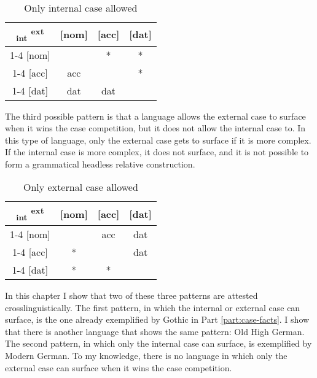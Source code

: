 \begin{table}[ht]
  \center
  \caption{Only internal case allowed}
  \begin{tabular}{c|c|c|c}
    \toprule
    \textsubscript{\ac{int}} \textsuperscript{\ac{ext}}
           & [\ac{nom}]
           & [\ac{acc}]
           & [\ac{dat}]
           \\ \cmidrule{1-4}
       [\ac{nom}]
           &
           & *
           & *
           \\ \cmidrule{1-4}
       [\ac{acc}]
           & \ac{acc}
           &
           & *
           \\ \cmidrule{1-4}
       [\ac{dat}]
           & \ac{dat}
           & \ac{dat}
           &
           \\
     \bottomrule
  \end{tabular}
    \label{tbl:case-competition-only-int}
\end{table}

The third possible pattern is that a language allows the external case to surface when it wins the case competition, but it does not allow the internal case to. In this type of language, only the external case gets to surface if it is more complex. If the internal case is more complex, it does not surface, and it is not possible to form a grammatical headless relative construction.

\begin{table}[ht]
  \center
  \caption{Only external case allowed}
  \begin{tabular}{c|c|c|c}
    \toprule
    \textsubscript{\ac{int}} \textsuperscript{\ac{ext}}
           & [\ac{nom}]
           & [\ac{acc}]
           & [\ac{dat}]
           \\ \cmidrule{1-4}
       [\ac{nom}]
           &
           & \ac{acc}
           & \ac{dat}
           \\ \cmidrule{1-4}
       [\ac{acc}]
           & *
           &
           & \ac{dat}
           \\ \cmidrule{1-4}
       [\ac{dat}]
           & *
           & *
           &
           \\
     \bottomrule
  \end{tabular}
    \label{tbl:case-competition-only-ext}
\end{table}

In this chapter I show that two of these three patterns are attested crosslinguistically. The first pattern, in which the internal or external case can surface, is the one already exemplified by Gothic in Part \ref{part:case-facts}. I show that there is another language that shows the same pattern: Old High German. The second pattern, in which only the internal case can surface, is exemplified by Modern German. To my knowledge, there is no language in which only the external case can surface when it wins the case competition.

